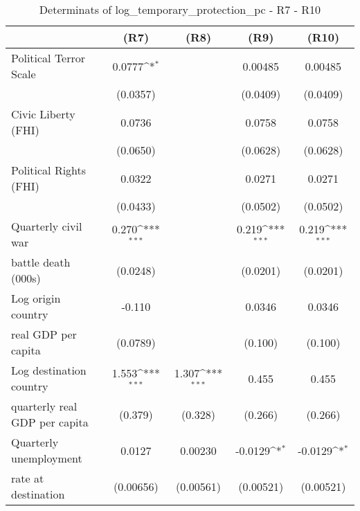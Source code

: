 \begin{table}[htbp]\centering \scriptsize
\def\sym#1{\ifmmode^{#1}\else\(^{#1}\)\fi}
\caption{Determinats of log\_temporary\_protection\_pc - R7 - R10}
\begin{tabular}{l*{4}{c}}
\hline\hline
                    &\multicolumn{1}{c}{(R7)}&\multicolumn{1}{c}{(R8)}&\multicolumn{1}{c}{(R9)}&\multicolumn{1}{c}{(R10)}\\
\hline
Political Terror Scale&      0.0777\sym{*}  &                     &     0.00485         &     0.00485         \\
                    &    (0.0357)         &                     &    (0.0409)         &    (0.0409)         \\
[0,5em]
Civic Liberty (FHI) &      0.0736         &                     &      0.0758         &      0.0758         \\
                    &    (0.0650)         &                     &    (0.0628)         &    (0.0628)         \\
[0,5em]
Political Rights (FHI)&      0.0322         &                     &      0.0271         &      0.0271         \\
                    &    (0.0433)         &                     &    (0.0502)         &    (0.0502)         \\
[0,5em]
Quarterly civil war&       0.270\sym{***}&                     &       0.219\sym{***}&       0.219\sym{***}\\
 battle death (000s)                    &    (0.0248)         &                     &    (0.0201)         &    (0.0201)         \\
[0,5em]
Log origin country&      -0.110         &                     &      0.0346         &      0.0346         \\
 real GDP per capita                    &    (0.0789)         &                     &     (0.100)         &     (0.100)         \\
[0,5em]
Log destination country&       1.553\sym{***}&       1.307\sym{***}&       0.455         &       0.455         \\
 quarterly real GDP per capita                    &     (0.379)         &     (0.328)         &     (0.266)         &     (0.266)         \\
[0,5em]
Quarterly unemployment&      0.0127         &     0.00230         &     -0.0129\sym{*}  &     -0.0129\sym{*}  \\
  rate at destination                   &   (0.00656)         &   (0.00561)         &   (0.00521)         &   (0.00521)         \\

\end{tabular}
\end{table}
